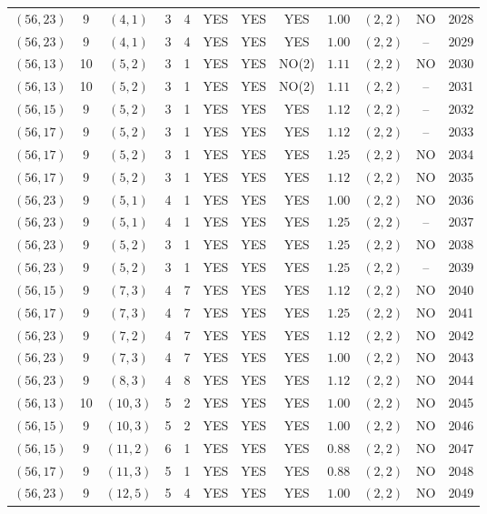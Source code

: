 \begin{longtable}{|c|c|c|c|c|c|c|c|c|c|c|c|}
$(56,23)$ & 9 & $(4,1)$ & 3 & 4 & YES & YES & YES & $1.00$ & $(2,2)$ & NO & 2028\\
$(56,23)$ & 9 & $(4,1)$ & 3 & 4 & YES & YES & YES & $1.00$ & $(2,2)$ & -- & 2029\\
$(56,13)$ & 10 & $(5,2)$ & 3 & 1 & YES & YES & NO(2) & $1.11$ & $(2,2)$ & NO & 2030\\
$(56,13)$ & 10 & $(5,2)$ & 3 & 1 & YES & YES & NO(2) & $1.11$ & $(2,2)$ & -- & 2031\\
$(56,15)$ & 9 & $(5,2)$ & 3 & 1 & YES & YES & YES & $1.12$ & $(2,2)$ & -- & 2032\\
$(56,17)$ & 9 & $(5,2)$ & 3 & 1 & YES & YES & YES & $1.12$ & $(2,2)$ & -- & 2033\\
$(56,17)$ & 9 & $(5,2)$ & 3 & 1 & YES & YES & YES & $1.25$ & $(2,2)$ & NO & 2034\\
$(56,17)$ & 9 & $(5,2)$ & 3 & 1 & YES & YES & YES & $1.12$ & $(2,2)$ & NO & 2035\\
$(56,23)$ & 9 & $(5,1)$ & 4 & 1 & YES & YES & YES & $1.00$ & $(2,2)$ & NO & 2036\\
$(56,23)$ & 9 & $(5,1)$ & 4 & 1 & YES & YES & YES & $1.25$ & $(2,2)$ & -- & 2037\\
$(56,23)$ & 9 & $(5,2)$ & 3 & 1 & YES & YES & YES & $1.25$ & $(2,2)$ & NO & 2038\\
$(56,23)$ & 9 & $(5,2)$ & 3 & 1 & YES & YES & YES & $1.25$ & $(2,2)$ & -- & 2039\\
$(56,15)$ & 9 & $(7,3)$ & 4 & 7 & YES & YES & YES & $1.12$ & $(2,2)$ & NO & 2040\\
$(56,17)$ & 9 & $(7,3)$ & 4 & 7 & YES & YES & YES & $1.25$ & $(2,2)$ & NO & 2041\\
$(56,23)$ & 9 & $(7,2)$ & 4 & 7 & YES & YES & YES & $1.12$ & $(2,2)$ & NO & 2042\\
$(56,23)$ & 9 & $(7,3)$ & 4 & 7 & YES & YES & YES & $1.00$ & $(2,2)$ & NO & 2043\\
$(56,23)$ & 9 & $(8,3)$ & 4 & 8 & YES & YES & YES & $1.12$ & $(2,2)$ & NO & 2044\\
$(56,13)$ & 10 & $(10,3)$ & 5 & 2 & YES & YES & YES & $1.00$ & $(2,2)$ & NO & 2045\\
$(56,15)$ & 9 & $(10,3)$ & 5 & 2 & YES & YES & YES & $1.00$ & $(2,2)$ & NO & 2046\\
$(56,15)$ & 9 & $(11,2)$ & 6 & 1 & YES & YES & YES & $0.88$ & $(2,2)$ & NO & 2047\\
$(56,17)$ & 9 & $(11,3)$ & 5 & 1 & YES & YES & YES & $0.88$ & $(2,2)$ & NO & 2048\\
$(56,23)$ & 9 & $(12,5)$ & 5 & 4 & YES & YES & YES & $1.00$ & $(2,2)$ & NO & 2049\\

\end{longtable}
